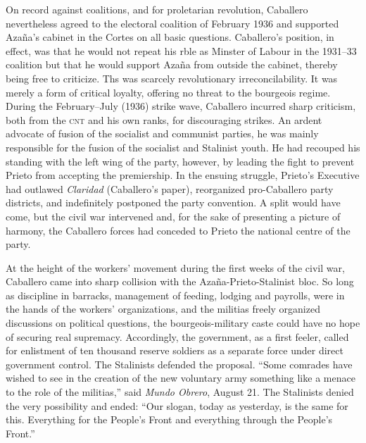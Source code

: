 On record against coalitions, and for proletarian revolution, Caballero nevertheless agreed to the electoral coalition of February 1936 and supported Azaña’s cabinet in the Cortes on all basic questions. Caballero’s position, in effect, was that he would not repeat his rble as Minster of Labour in the 1931–33 coalition but that he would support Azaña from outside the cabinet, thereby being free to criticize. Ths was scarcely revolutionary irreconcilability. It was merely a form of critical loyalty, offering no threat to the bourgeois regime. During the February–July (1936) strike wave, Caballero incurred sharp criticism, both from the \textsc{cnt} and his own ranks, for discouraging strikes. An ardent advocate of fusion of the socialist and communist parties, he was mainly responsible for the fusion of the socialist and Stalinist youth. He had recouped his standing with the left wing of the party, however, by leading the fight to prevent Prieto from accepting the premiership. In the ensuing struggle, Prieto’s Executive had outlawed \emph{Claridad} (Caballero’s paper), reorganized pro-Caballero party districts, and indefinitely postponed the party convention. A split would have come, but the civil war intervened and, for the sake of presenting a picture of harmony, the Caballero forces had conceded to Prieto the national centre of the party.

At the height of the workers’ movement during the first weeks of the civil war, Caballero came into sharp collision with the Azaña-Prieto-Stalinist bloc. So long as discipline in barracks, management of feeding, lodging and payrolls, were in the hands of the workers’ organizations, and the militias freely organized discussions on political questions, the bourgeois-military caste could have no hope of securing real supremacy. Accordingly, the government, as a first feeler, called for enlistment of ten thousand reserve soldiers as a separate force under direct government control. The Stalinists defended the proposal. ``Some comrades have wished to see in the creation of the new voluntary army something like a menace to the role of the militias,'' said \emph{Mundo Obrero}, August 21. The Stalinists denied the very possibility and ended: ``Our slogan, today as yesterday, is the same for this. Everything for the People’s Front and everything through the People’s Front.''

